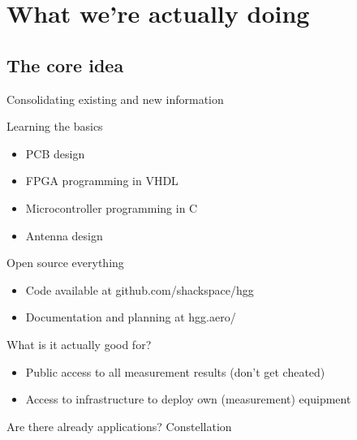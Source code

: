 \section{What we're actually doing}

\subsection{The core idea}
	\begin{frame}{Consolidating existing and new information}
	\end{frame}
	\begin{frame}{Learning the basics}
		\begin{itemize}
			\item PCB design
			\item FPGA programming in VHDL
			\item Microcontroller programming in C
			\item Antenna design
		\end{itemize}
	\end{frame}
	\begin{frame}{Open source everything}
		\begin{itemize}
			\item Code available at github.com/shackspace/hgg
			\item Documentation and planning at hgg.aero/
		\end{itemize}
	\end{frame}
	\begin{frame}{What is it actually good for?}
		\begin{itemize}
			\item Public access to all measurement results (don't get cheated)
			\item Access to infrastructure to deploy own (measurement) equipment
		\end{itemize}
	\end{frame}
	\begin{frame}{Are there already applications?}
		Constellation
	\end{frame}

